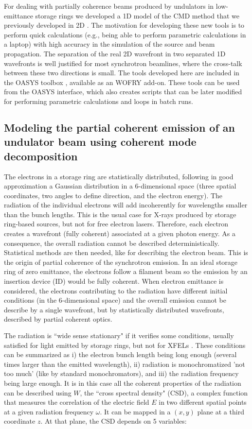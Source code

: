 \documentclass{iucr}              %
\begin{document}
For dealing with partially coherence beams produced by undulators in low-emittance storage rings we developed a 1D model of the CMD method that we previously developed in 2D \cite{glass2017}. The motivation for developing these new tools is to perform quick calculations (e.g., being able to perform parametric calculations in a laptop) with high accuracy in the simulation of the source and beam propagation. The separation of the real 2D wavefront in two separated 1D wavefronts is well justified for most synchrotron beamlines, where the cross-talk between these two directions is small. 
The tools developed here are included in the OASYS toolbox \cite{codeOASYS}, available as an WOFRY add-on. These tools can be used from the OASYS interface, which also creates scripts that can be later modified for performing parametric calculations and loops in batch runs. 


\subsection{Modeling the partial coherent emission of an undulator beam using coherent mode decomposition}

The electrons in a storage ring are statistically distributed, following in good approximation a Gaussian distribution in a 6-dimensional space (three spatial coordinates, two angles to define direction, and the electron energy). The radiation of the individual electrons will add incoherently for wavelengths smaller than the bunch lengths. This is the usual case for X-rays produced by storage ring-based sources, but not for free electron lasers. Therefore, each electron creates a wavefront (fully coherent) associated at a given photon energy. As a consequence, the overall radiation cannot be described deterministically. Statistical methods are then needed, like for describing the electron beam. This is the origin of partial coherence of the synchrotron emission. In an ideal storage ring of zero emittance, the electrons follow a filament beam so the emission by an insertion device (ID) would be fully coherent. When electron emittance is considered, the electrons contributing to the radiation have different initial conditions (in the 6-dimensional space) and the overall emission cannot be describe by a single wavefront, but by statistically distributed wavefronts, described by partial coherent optics.

The radiation is ``wide sense stationary" \cite{mandel_wolf} if it verifies some conditions, usually satisfied for light emitted by storage rings, but not for XFELs \cite{geloni2008}. These conditions can be summarized as
i) the electron bunch length being long enough (several times larger than the emitted wavelength),
ii) radiation is monochromatized 'not too much' (like by standard monochromators), and 
iii) the radiation frequency being large enough.
It is in this case all the coherent properties of the radiation can be described using $W$, the ``cross spectral density" (CSD), a complex function that measures the correlation of the electric field $E$ in two different spatial points at a given radiation frequency $\omega$. It can be mapped in a $(x,y)$ plane at a third coordinate $z$. At that plane, the CSD depends on 5 variables: 
\end{document}
